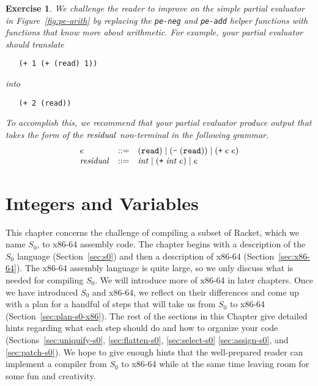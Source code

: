 \documentclass[12pt]{book}
\newtheorem{exercise}[theorem]{Exercise}
\begin{document}
\begin{exercise}
\normalfont %
We challenge the reader to improve on the simple partial evaluator in
Figure~\ref{fig:pe-arith} by replacing the \texttt{pe-neg} and
\texttt{pe-add} helper functions with functions that know more about
arithmetic. For example, your partial evaluator should translate
\begin{lstlisting}
   (+ 1 (+ (read) 1))
\end{lstlisting}
into
\begin{lstlisting}
   (+ 2 (read))
\end{lstlisting}
To accomplish this, we recommend that your partial evaluator produce
output that takes the form of the $\mathit{residual}$ non-terminal in the
following grammar.
\[
\begin{array}{lcl}
e &::=& (\texttt{read}) \mid (\texttt{-} \;(\texttt{read})) \mid (\texttt{+} \; e \; e)\\
\mathit{residual} &::=& \mathit{int} \mid (\texttt{+}\; \mathit{int}\; e) \mid e
\end{array}
\]
\end{exercise}


\chapter{Integers and Variables}
\label{ch:int-exp}

This chapter concerns the challenge of compiling a subset of Racket,
which we name $S_0$, to x86-64 assembly code. The chapter begins with
a description of the $S_0$ language (Section~\ref{sec:s0}) and then a
description of x86-64 (Section~\ref{sec:x86-64}). The x86-64 assembly
language is quite large, so we only discuss what is needed for
compiling $S_0$. We will introduce more of x86-64 in later
chapters. Once we have introduced $S_0$ and x86-64, we reflect on
their differences and come up with a plan for a handful of steps that
will take us from $S_0$ to x86-64 (Section~\ref{sec:plan-s0-x86}).
The rest of the sections in this Chapter give detailed hints regarding
what each step should do and how to organize your code
(Sections~\ref{sec:uniquify-s0}, \ref{sec:flatten-s0},
\ref{sec:select-s0} \ref{sec:assign-s0}, and \ref{sec:patch-s0}).  We
hope to give enough hints that the well-prepared reader can implement
a compiler from $S_0$ to x86-64 while at the same time leaving room
for some fun and creativity.
\end{document}
